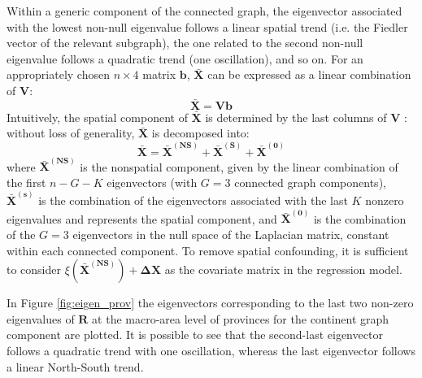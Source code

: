 \documentclass[openany]{book}
\begin{document}
Within a generic component of the connected graph, the eigenvector associated with the lowest non-null eigenvalue follows a linear spatial trend (i.e. the Fiedler vector of the relevant subgraph), the one related to the second non-null eigenvalue follows a quadratic trend (one oscillation), and so on.
For an appropriately chosen $n \times 4$ matrix $\mathbf{b}$, $\mathbf{\bar{X}}$ can be expressed as a linear combination of $\mathbf{V}$:
$$
\mathbf{\bar{X}} = \mathbf{Vb}
$$
Intuitively, the spatial component of $\mathbf{\bar{X}}$ is determined by the last columns of $\mathbf{V}$ \citep{Urdangarin24}: without loss of generality, $\mathbf{\bar{X}}$ is decomposed into:
$$
\mathbf{\bar{X} }= \mathbf{\bar{X}^{(NS)}} + \mathbf{\bar{X}^{(S)}} +\mathbf{ \bar{X}^{(0)}}
$$
where $\mathbf{\bar{X}^{(NS)}}$ is the nonspatial component, given by the linear combination of the first $n-G-K$ eigenvectors (with $G=3$ connected graph components), $\mathbf{\bar{X}^{(s)}}$ is the combination of the eigenvectors associated with the last $K$ nonzero eigenvalues and represents the spatial component, and $\mathbf{\bar{X}^{(0)}}$ is the combination of the $G=3$ eigenvectors in the null space of the Laplacian matrix, constant within each connected component. 
To remove spatial confounding, it is sufficient to consider $\xi \left(\mathbf{\bar{X}^{(NS)}} \right) + \mathbf{ \Delta X}$ as the covariate matrix in the regression model. 



In Figure \ref{fig:eigen_prov} the eigenvectors corresponding to the last two non-zero eigenvalues of $\mathbf{R}$ at the macro-area level of provinces for the continent graph component are plotted. It is possible to see that the second-last eigenvector follows a quadratic trend with one oscillation, whereas the last eigenvector follows a linear North-South trend.  
\end{document}
